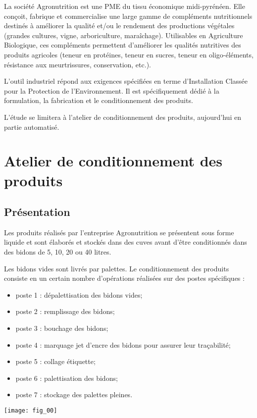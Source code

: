 \ifprof
\else
La société Agronutrition est une PME du tissu économique midi-pyrénéen. Elle conçoit, 
fabrique et commercialise une large gamme de compléments nutritionnels destinés à 
améliorer la qualité et/ou le rendement des productions végétales (grandes cultures, vigne, 
arboriculture, maraîchage). Utilisables en Agriculture Biologique, ces compléments 
permettent d'améliorer les qualités nutritives des produits agricoles (teneur en protéines, 
teneur en sucres, teneur en oligo-éléments, résistance aux meurtrissures, conservation, etc.). 

L’outil industriel répond aux exigences spécifiées en terme d’Installation Classée pour la 
Protection de l’Environnement. Il est spécifiquement dédié à la formulation, la fabrication et 
le conditionnement des produits. 

L’étude se limitera à l’atelier de conditionnement des produits, aujourd’hui en partie 
automatisé.
\fi

\section{Atelier de conditionnement des produits}

\subsection{Présentation }
\ifprof
\else

Les produits réalisés par l’entreprise Agronutrition se présentent sous forme liquide et sont 
élaborés et stockés dans des cuves avant d’être conditionnés dans des bidons de 5, 10, 20 ou 
40 litres. 

\vspace{.4cm}
\begin{minipage}[c]{.53\linewidth}
Les bidons vides sont livrés par palettes. Le conditionnement des produits consiste en un 
certain nombre d’opérations réalisées sur des postes spécifiques : 
\begin{itemize}
\item poste 1 : dépalettisation des bidons vides;
\item poste 2 : remplissage des bidons;
\item poste 3 : bouchage des bidons;
\item poste 4 : marquage jet d’encre des bidons pour assurer leur traçabilité;
\item poste 5 : collage étiquette;
\item poste 6 : palettisation des bidons;
\item poste 7 : stockage des palettes pleines. 
\end{itemize}

\end{minipage} \hfill
\begin{minipage}[c]{.45\linewidth}
\begin{center}
\texttt{[image: fig\_00]}
\end{center}
\end{minipage}


